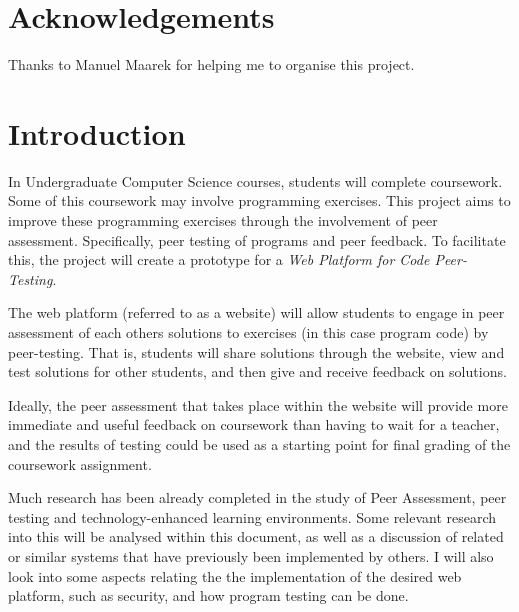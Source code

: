 \documentclass[a4paper,11pt]{report}
\begin{document}
\vfill

\section*{Acknowledgements}
Thanks to Manuel Maarek for helping me to organise this project.

\newpage

\pagestyle{headings}


\section{Introduction}
In Undergraduate Computer Science courses, students will complete coursework. Some of this coursework may involve programming exercises. This project aims to improve these programming exercises through the involvement of peer assessment. Specifically, peer testing of programs and peer feedback. To facilitate this, the project will create a prototype for a \textit{Web Platform for Code Peer-Testing}.\par
The web platform (referred to as a website) will allow students to engage in peer assessment of each others solutions to exercises (in this case program code) by peer-testing. That is, students will share solutions through the website, view and test solutions for other students, and then give and receive feedback on solutions.\par
Ideally, the peer assessment that takes place within the website will provide more immediate and useful feedback on coursework than having to wait for a teacher, and the results of testing could be used as a starting point for final grading of the coursework assignment.\par

Much research has been already completed in the study of Peer Assessment, peer testing and technology-enhanced learning environments. Some relevant research into this will be analysed within this document, as well as a discussion of related or similar systems that have previously been implemented by others. I will also look into some aspects relating the the implementation of the desired web platform, such as security, and how program testing can be done.\par
\end{document}
